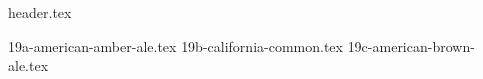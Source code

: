 \clearpage
{}
\divisorLine
{header.tex}
\begin{multicols*}{2}
{19a-american-amber-ale.tex}
{19b-california-common.tex}
{19c-american-brown-ale.tex}
\end{multicols*}